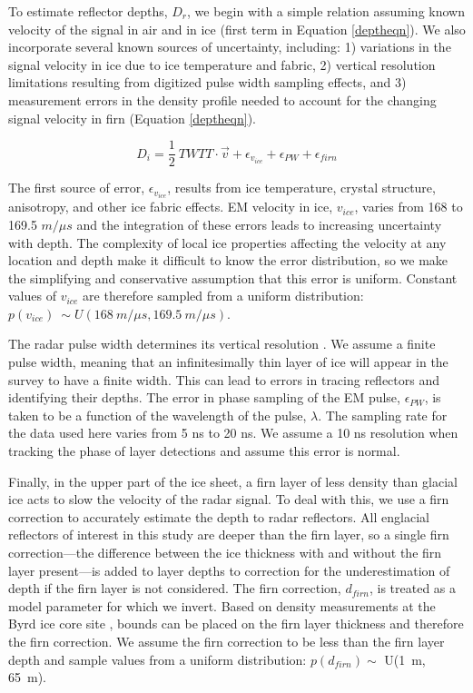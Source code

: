 To estimate reflector depths, $D_r$, we begin with a simple relation assuming known velocity of the signal in air and in ice (first term in Equation \ref{deptheqn}). We also incorporate several known sources of uncertainty, including: 1) variations in the signal velocity in ice due to ice temperature and fabric, 2) vertical resolution limitations resulting from digitized pulse width sampling effects, and 3) measurement errors in the density profile needed to account for the changing signal velocity in firn (Equation \ref{deptheqn}).

\begin{equation}\label{deptheqn}
D_i = \frac{1}{2}~TWTT \cdot \vec{v} + \epsilon_{v_{ice}} + \epsilon_{PW} + \epsilon_{firn}
\end{equation}

The first source of error, $\epsilon_{v_{ice}}$, results from ice temperature, crystal structure, anisotropy, and other ice fabric effects. EM velocity in ice, $v_{ice}$, varies from 168 to 169.5 $m/{\mu}s$ \citep{fujita2000} and the integration of these errors leads to increasing uncertainty with depth.  The complexity of local ice properties affecting the velocity at any location and depth make it difficult to know the error distribution, so we make the simplifying and conservative assumption that this error is uniform. Constant values of $v_{ice}$ are therefore sampled from a uniform distribution: $p(v_{ice}) ~\sim U(168~m/{\mu}s,169.5~m/{\mu}s)$.

The radar pulse width determines its vertical resolution \citep{millar1982}. We assume a finite pulse width, meaning that an infinitesimally thin layer of ice will appear in the survey to have a finite width. This can lead to errors in tracing reflectors and identifying their depths. The error in phase sampling of the EM pulse, $\epsilon_{PW}$, is taken to be a function of the wavelength of the pulse, $\lambda$. The sampling rate for the data used here varies from 5 ns to 20 ns. We assume a 10 ns resolution when tracking the phase of layer detections and assume this error is normal.

Finally, in the upper part of the ice sheet, a firn layer of less density than glacial ice acts to slow the velocity of the radar signal. To deal with this, we use a firn correction to accurately estimate the depth to radar reflectors. All englacial reflectors of interest in this study are deeper than the firn layer, so a single firn correction---the difference between the ice thickness with and without the firn layer present---is added to layer depths to correction for the underestimation of depth if the firn layer is not considered. The firn correction, $d_{firn}$, is treated as a model parameter for which we invert. Based on density measurements at the Byrd ice core site \citep{gow1970}, bounds can be placed on the firn layer thickness and therefore the firn correction. We assume the firn correction to be less than the firn layer depth and sample values from a uniform distribution: $p(d_{firn})\sim$ U(1~m, 65~m). %

